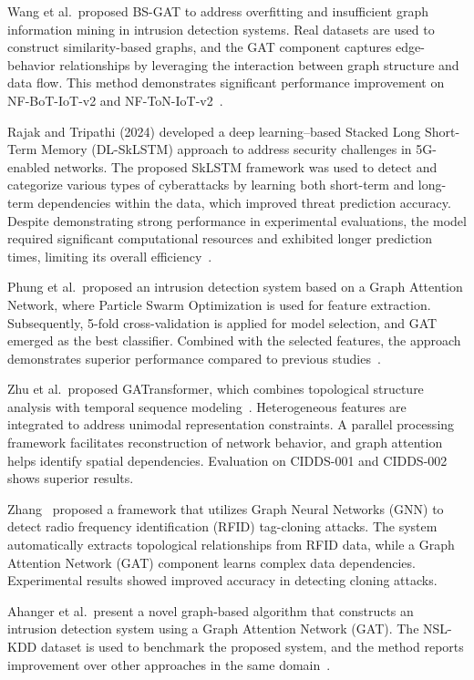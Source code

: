 \documentclass[a4paper,fleqn]{cas-sc}
\begin{document}
Wang et al.\ proposed BS-GAT to address overfitting and insufficient graph information mining in intrusion detection systems. Real datasets are used to construct similarity-based graphs, and the GAT component captures edge-behavior relationships by leveraging the interaction between graph structure and data flow. This method demonstrates significant performance improvement on NF-BoT-IoT-v2 and NF-ToN-IoT-v2~\cite{bib7}.

Rajak and Tripathi (2024) developed a deep learning--based Stacked Long Short-Term Memory (DL-SkLSTM) approach to address security challenges in 5G-enabled networks. The proposed SkLSTM framework was used to detect and categorize various types of cyberattacks by learning both short-term and long-term dependencies within the data, which improved threat prediction accuracy. Despite demonstrating strong performance in experimental evaluations, the model required significant computational resources and exhibited longer prediction times, limiting its overall efficiency~\cite{bib8}.

Phung et al.\ proposed an intrusion detection system based on a Graph Attention Network, where Particle Swarm Optimization is used for feature extraction. Subsequently, 5-fold cross-validation is applied for model selection, and GAT emerged as the best classifier. Combined with the selected features, the approach demonstrates superior performance compared to previous studies~\cite{bib9}.

Zhu et al.\ proposed GATransformer, which combines topological structure analysis with temporal sequence modeling~\cite{bib10}. Heterogeneous features are integrated to address unimodal representation constraints. A parallel processing framework facilitates reconstruction of network behavior, and graph attention helps identify spatial dependencies. Evaluation on CIDDS-001 and CIDDS-002 shows superior results.

Zhang~\cite{bib11} proposed a framework that utilizes Graph Neural Networks (GNN) to detect radio frequency identification (RFID) tag-cloning attacks. The system automatically extracts topological relationships from RFID data, while a Graph Attention Network (GAT) component learns complex data dependencies. Experimental results showed improved accuracy in detecting cloning attacks.

Ahanger et al.\ present a novel graph-based algorithm that constructs an intrusion detection system using a Graph Attention Network (GAT). The NSL-KDD dataset is used to benchmark the proposed system, and the method reports improvement over other approaches in the same domain~\cite{bib12}.
\end{document}
